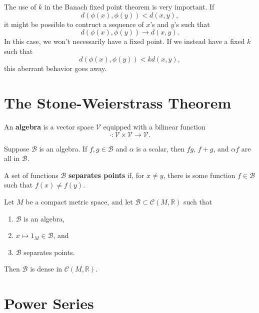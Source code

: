 \documentclass[10pt]{report}
\begin{document}
\begin{note}{}{}
	The use of $ k$ in the Banach fixed point theorem is very important. If
	\[
		d(\phi(x), \phi(y)) < d(x,y),
	\] it might be possible to contruct a sequence of $x$'s and $y$'s such that
	\[
		d(\phi(x), \phi(y)) \to d(x,y).
	\] In this case, we won't necessarily have a fixed point. If we instead have a fixed $k$ such that
	\[
	d(\phi(x), \phi(y)) < k d(x,y),
	\] this aberrant behavior goes away.
\end{note}



\section{The Stone-Weierstrass Theorem}

\begin{defn}[]
An \textbf{algebra} is a vector space $\mathcal{V}$ equipped with a bilinear function \[\cdot : \mathcal{V} \times \mathcal{V} \to \mathcal{V}.\]
\end{defn}

Suppose $\mathcal{B}$ is an algebra. If $f,g \in \mathcal{B}$ and $\alpha$ is a scalar, then $fg$, $f+g$, and $\alpha f$ are all in $\mathcal{B}$.

\begin{defn}[]
	A set of functions $\mathcal{B}$ \textbf{separates points} if, for $x \neq y$, there is some function $f \in \mathcal{B}$ such that $f(x) \neq f(y)$.
\end{defn}

\begin{thrm}
	Let $M$ be a compact metric space, and let $\mathcal{B} \subset \mathcal{C}(M, \mathbb{R})$ such that
	\begin{enumerate}
		\item $\mathcal{B}$ is an algebra,
		\item $x \mapsto 1_M \in \mathcal{B}$, and
		\item $\mathcal{B}$ separates points.
	\end{enumerate}
	Then $\mathcal{B}$ is dense in $\mathcal{C}(M, \mathbb{R})$.
\end{thrm}

\pagebreak


\section{Power Series}
\end{document}
